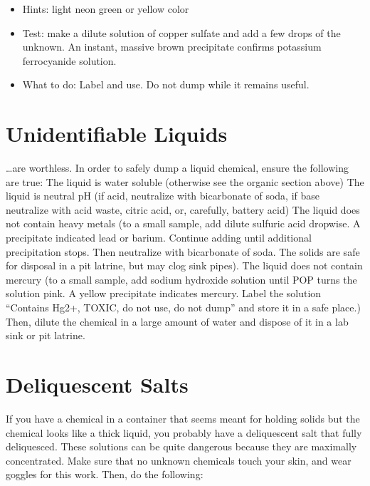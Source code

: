 \begin{itemize}

\item{Hints: light neon green or yellow color}

\item{Test: make a dilute solution of copper sulfate and add a few drops of the unknown. 
An instant, 
massive brown precipitate confirms potassium ferrocyanide solution.}

\item{What to do: Label and use. 
Do not dump while it remains useful.}

\end{itemize}

\section{Unidentifiable Liquids}

…are worthless. 
In order to safely dump a liquid chemical, 
ensure the following are true:
The liquid is water soluble (otherwise see the organic section above)
The liquid is neutral pH (if acid, 
neutralize with bicarbonate of soda, 
if base neutralize with acid waste, 
citric acid, 
or, 
carefully, 
battery acid)
The liquid does not contain heavy metals (to a small sample, 
add dilute sulfuric acid dropwise. 
A precipitate indicated lead or barium. 
Continue adding until additional precipitation stops. 
Then neutralize with bicarbonate of soda. 
The solids are safe for disposal in a pit latrine, 
but may clog sink pipes).
The liquid does not contain mercury (to a small sample, 
add sodium hydroxide solution until POP turns the solution pink. 
A yellow precipitate indicates mercury. 
Label the solution “Contains Hg2+, 
TOXIC, 
do not use, 
do not dump” and store it in a safe place.)
Then, 
dilute the chemical in a large amount of water 
and dispose of it in a lab sink or pit latrine.

\section{Deliquescent Salts}

If you have a chemical in a container that seems meant 
for holding solids but the chemical looks like a thick liquid, 
you probably have a deliquescent salt that fully deliquesced. 
These solutions can be quite dangerous 
because they are maximally concentrated. 
Make sure that no unknown chemicals touch your skin, 
and wear goggles for this work. 
Then, 
do the following:

